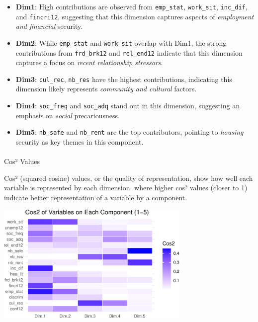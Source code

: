\documentclass[
]{article}
\makeatletter
\let\oldparagraph\paragraph
\renewcommand{\paragraph}{
    \@ifstar
      \xxxParagraphStar
      \xxxParagraphNoStar
  }
\newcommand{\xxxParagraphStar}[1]{\oldparagraph*{#1}\mbox{}}
\newcommand{\xxxParagraphNoStar}[1]{\oldparagraph{#1}\mbox{}}
\makeatother
\begin{document}
\begin{itemize}
\item
  \textbf{Dim1}: High contributions are observed from
  \texttt{emp\_stat}, \texttt{work\_sit}, \texttt{inc\_dif}, and
  \texttt{fincri12}, suggesting that this dimension captures aspects of
  \emph{employment and financial} security.
\item
  \textbf{Dim2}: While \texttt{emp\_stat} and \texttt{work\_sit} overlap
  with Dim1, the strong contributions from \texttt{frd\_brk12} and
  \texttt{rel\_end12} indicate that this dimension captures a focus on
  \emph{recent relationship stressors}.
\item
  \textbf{Dim3}: \texttt{cul\_rec}, \texttt{nb\_res} have the highest
  contributions, indicating this dimension likely represents
  \emph{community and cultural} factors.
\item
  \textbf{Dim4}: \texttt{soc\_freq} and \texttt{soc\_adq} stand out in
  this dimension, suggesting an emphasis on \emph{social}
  precariousness.
\item
  \textbf{Dim5}: \texttt{nb\_safe} and \texttt{nb\_rent} are the top
  contributors, pointing to \emph{housing} security as key themes in
  this component.
\end{itemize}

\paragraph{Cos² Values}\label{cosuxb2-values}

Cos² (squared cosine) values, or the quality of representation, show how
well each variable is represented by each dimension. where higher cos²
values (closer to 1) indicate better representation of a variable by a
component.

\begin{center}
\includegraphics[width=0.7\textwidth,height=\textheight]{draft_v2_files/figure-pdf/unnamed-chunk-17-1.pdf}
\end{center}
\end{document}
